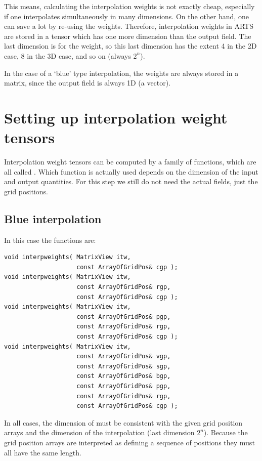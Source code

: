 This means, calculating the interpolation weights is not exactly
cheap, especially if one interpolates simultaneously in many
dimensions. On the other hand, one can save a lot by re-using the
weights.  Therefore, interpolation weights in ARTS are stored in a
tensor which has one more dimension than the output field. The last
dimension is for the weight, so this last dimension has the extent 4
in the 2D case, 8 in the 3D case, and so on (always $2^n$).

In the case of a `blue' type interpolation, the weights are
always stored in a matrix, since the output field is always 1D (a
vector). 

\section{Setting up interpolation weight tensors}

Interpolation weight tensors can be computed by a family of functions,
which are all called . Which function is actually
used depends on the dimension of the input and output quantities. For
this step we still do not need the actual fields, just the grid
positions.

\subsection{Blue interpolation}

In this case the functions are:

{\small
\begin{verbatim}
void interpweights( MatrixView itw,
                    const ArrayOfGridPos& cgp );
void interpweights( MatrixView itw,
                    const ArrayOfGridPos& rgp,
                    const ArrayOfGridPos& cgp );
void interpweights( MatrixView itw,
                    const ArrayOfGridPos& pgp,
                    const ArrayOfGridPos& rgp,
                    const ArrayOfGridPos& cgp );
void interpweights( MatrixView itw,
                    const ArrayOfGridPos& vgp,
                    const ArrayOfGridPos& sgp,
                    const ArrayOfGridPos& bgp,
                    const ArrayOfGridPos& pgp,
                    const ArrayOfGridPos& rgp,
                    const ArrayOfGridPos& cgp );
\end{verbatim}
}

In all cases, the dimension of  must be consistent with the
given grid position arrays and the dimension of the interpolation
(last dimension $2^n$). Because the grid position arrays are
interpreted as defining a sequence of positions they must all have
the same length.

